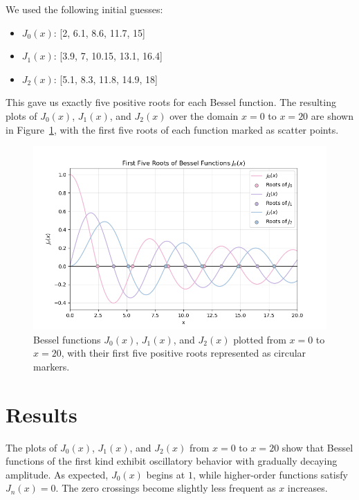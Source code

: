 \documentclass[linenumbers, twocolumn]{aastex631}
\begin{document}
\noindent We used the following initial guesses:
\begin{itemize}
    \item $J_0(x)$: [2, 6.1, 8.6, 11.7, 15]
    \item $J_1(x)$: [3.9, 7, 10.15, 13.1, 16.4]
    \item $J_2(x)$: [5.1, 8.3, 11.8, 14.9, 18]
\end{itemize}

\noindent This gave us exactly five positive roots for each Bessel function. The 
resulting plots of $J_0(x)$, $J_1(x)$, and $J_2(x)$ over the domain $x=0$ to
$x=20$ are shown in Figure~\ref{fig:bessel_roots}, with the first five roots of
each function marked as scatter points.

\begin{figure}[H]
    \centering
    \includegraphics[width=1.0\linewidth]{bessel_roots.png}
    \caption{Bessel functions $J_0(x)$, $J_1(x)$, and $J_2(x)$ plotted from $x=0$ to
    $x=20$, with their first five positive roots represented as circular markers.}
    \label{fig:bessel_roots}
\end{figure}


\section{Results} \label{sec:results}

The plots of $J_0(x)$, $J_1(x)$, and $J_2(x)$ from $x=0$ to $x=20$ show that
Bessel functions of the first kind exhibit oscillatory behavior with gradually
decaying amplitude. As expected, $J_0(x)$ begins at $1$, while higher-order
functions satisfy $J_n(x)=0$. The zero crossings become slightly less
frequent as $x$ increases.
\end{document}
